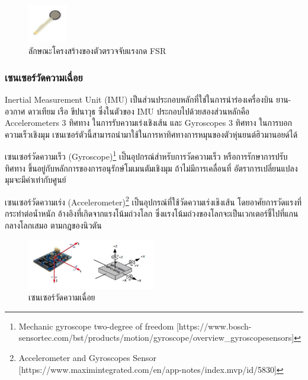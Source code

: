 \begin{figure}[!ht]
    \centering
    \includegraphics[width=0.15\textwidth]{chapter2/images/FSRx.jpg}
    \caption{ลักษณะโครงสร้างของตัวตรวจจับแรงกด FSR}
    \label{fig:fsr_sensor}
\end{figure}

\subsubsection*{เซนเซอร์วัดความเฉื่อย}
Inertial Measurement Unit (IMU) เป็นส่วนประกอบหลักที่ใช่ในการนำร่องเครื่องบิน ยาน-อวกาศ ดาวเทียม เรือ
ขีปนาวุธ ซึ่งในตัวของ IMU ประกอบไปด้วยสองส่วนหลักคือ Accelerometers 3 ทิศทาง ในการรับความเร่งเชิงเส้น
และ Gyroscopes 3 ทิศทาง ในการบอกความเร็วเชิงมุม เซนเซอร์ตัวนี้สามารถนำมาใช้ในการหาทิศทางการหมุนของตัวหุ่นยนต์ฮิวมานอยด์ได้

เซนเซอร์วัดความเร็ว (Gyroscope)\footnote{ Mechanic gyroscope two-degree of freedom [https://www.bosch-sensortec.com/bst/products/motion/gyroscope/overview\_gyroscopesensors] }
เป็นอุปกรณ์สำหรับการวัดความเร็ว หรือการรักษาการปรับทิศทาง ขึ้นอยู่กับหลักการของการอนุรักษ์โมเมนตัมเชิงมุม
ถ้าไม่มีการเคลื่อนที่ อัตราการเปลี่ยนแปลงมุมจะมีค่าเท่ากับศูนย์

เซนเซอร์วัดความเร่ง (Accelerometer)\footnote{ Accelerometer and Gyroscopes Sensor [https://www.maximintegrated.com/en/app-notes/index.mvp/id/5830] }
เป็นอุปกรณ์ที่ใช้วัดความเร่งเชิงเส้น โดยอาศัยการวัดแรงที่กระทำต่อน้ำหนัก
อ้างอิงที่เกิดจากแรงโน้มถ่วงโลก ซึ่งแรงโน้มถ่วงของโลกจะเป็นเวกเตอร์ชี้ไปที่แกนกลางโลกเสมอ ตามกฎของนิวตัน
\begin{figure}[!ht]
    \centering
    \includegraphics[width=0.5\textwidth]{chapter2/images/imu.png}
    \caption{เซนเซอร์วัดความเฉื่อย}
    \label{fig:imu_sensor}
\end{figure}

